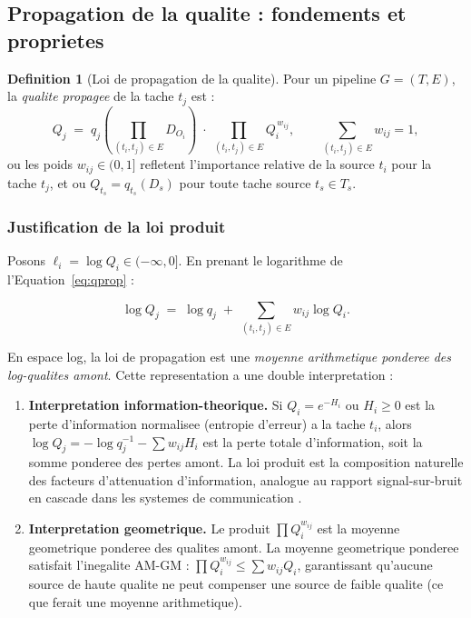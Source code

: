 \documentclass[12pt,a4paper]{article}
\theoremstyle{plain}
\theoremstyle{definition}
\newtheorem{definition}[theorem]{Definition}
\theoremstyle{remark}
\begin{document}
	\subsection{Propagation de la qualite : fondements et proprietes}
	\label{subsec:quality_prop}
	
	\begin{definition}[Loi de propagation de la qualite]
		\label{def:qprop}
		Pour un pipeline $G=(T,E)$, la \emph{qualite propagee} de la tache
		$t_j$ est :
		\begin{equation}
			Q_j \;=\; q_j\!\left(\prod_{(t_i,t_j)\in E} D_{O_i}\right)
			\;\cdot\;
			\prod_{(t_i,t_j)\in E} Q_i^{\,w_{ij}},
			\qquad
			\sum_{(t_i,t_j)\in E} w_{ij} = 1,
			\label{eq:qprop}
		\end{equation}
		ou les poids $w_{ij} \in (0,1]$ refletent l'importance relative de
		la source $t_i$ pour la tache $t_j$, et ou $Q_{t_s} = q_{t_s}(D_s)$
		pour toute tache source $t_s \in T_s$.
	\end{definition}
	
	\subsubsection{Justification de la loi produit}
	\label{subsec:product_justification}
	
	Posons $\ell_i = \log Q_i \in (-\infty, 0]$. En prenant le logarithme
	de l'Equation~\eqref{eq:qprop} :
	
	\begin{equation}
		\log Q_j \;=\; \log q_j \;+\; \sum_{(t_i,t_j)\in E} w_{ij} \log Q_i.
		\label{eq:logprop}
	\end{equation}
	
	En espace log, la loi de propagation est une \emph{moyenne arithmetique
		ponderee des log-qualites amont}. Cette representation a une double
	interpretation :
	
	\begin{enumerate}[leftmargin=1.5em,itemsep=2pt]
		\item \textbf{Interpretation information-theorique.}
		Si $Q_i = e^{-H_i}$ ou $H_i \geq 0$ est la perte d'information
		normalisee (entropie d'erreur) a la tache $t_i$, alors
		$\log Q_j = -\log q_j^{-1} - \sum w_{ij} H_i$ est la perte
		totale d'information, soit la somme ponderee des pertes amont.
		La loi produit est la composition naturelle des facteurs
		d'attenuation d'information, analogue au rapport signal-sur-bruit
		en cascade dans les systemes de communication \cite{shannon_info}.
		
		\item \textbf{Interpretation geometrique.}
		Le produit $\prod Q_i^{w_{ij}}$ est la moyenne geometrique ponderee
		des qualites amont. La moyenne geometrique ponderee satisfait
		l'inegalite AM-GM : $\prod Q_i^{w_{ij}} \leq \sum w_{ij} Q_i$,
		garantissant qu'aucune source de haute qualite ne peut compenser
		une source de faible qualite (ce que ferait une moyenne arithmetique).
	\end{enumerate}
	
\end{document}
